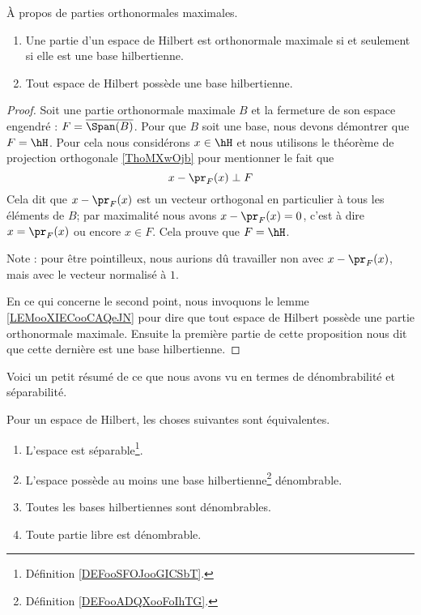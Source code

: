 \begin{proposition}      \label{PROPooLDXFooRaxBsI}
    À propos de parties orthonormales maximales.
    \begin{enumerate}
        \item
            Une partie d'un espace de Hilbert est orthonormale maximale si et seulement si elle est une base hilbertienne.
        \item       \label{ITEMooZFENooQnSlrv}
            Tout espace de Hilbert possède une base hilbertienne.
    \end{enumerate}
\end{proposition}

\begin{proof}
    Soit une partie orthonormale maximale \( B\) et la fermeture de son espace engendré : \( F=\overline{ \Span(B) }\). Pour que \( B\) soit une base, nous devons démontrer que \( F=\hH\). Pour cela nous considérons \( x\in \hH\) et nous utilisons le théorème de projection orthogonale \ref{ThoMXwOjb} pour mentionner le fait que 
    \begin{equation}
        x-\pr_F(x)\perp F
    \end{equation}
    Cela dit que \( x-\pr_F(x)\) est un vecteur orthogonal en particulier à tous les éléments de \( B\); par maximalité nous avons \( x-\pr_F(x)=0\), c'est à dire \( x=\pr_F(x)\) ou encore \( x\in F\). Cela prouve que \( F=\hH\).

    Note : pour être pointilleux, nous aurions dû travailler non avec \( x-\pr_F(x)\), mais avec le vecteur normalisé à \( 1\).

    En ce qui concerne le second point, nous invoquons le lemme \ref{LEMooXIECooCAQeJN} pour dire que tout espace de Hilbert possède une partie orthonormale maximale. Ensuite la première partie de cette proposition nous dit que cette dernière est une base hilbertienne.
\end{proof}

Voici un petit résumé de ce que nous avons vu en termes de dénombrabilité et séparabilité.
\begin{theorem}     \label{THOooMKNFooVrCNGA}
    Pour un espace de Hilbert, les choses suivantes sont équivalentes.
    \begin{enumerate}
        \item       \label{ITEMooSJKVooFIIbwg}
            L'espace est séparable\footnote{Définition \ref{DEFooSFOJooGICSbT}.}.
        \item       \label{ITEMooQIZLooYdtYqF}
            L'espace possède au moins une base hilbertienne\footnote{Définition \ref{DEFooADQXooFoIhTG}.} dénombrable.
        \item       \label{ITEMooHYSXooOubwUy}
            Toutes les bases hilbertiennes sont dénombrables.
        \item       \label{ITEMooMZICooNBAVum}
            Toute partie libre est dénombrable.
    \end{enumerate}
\end{theorem}

